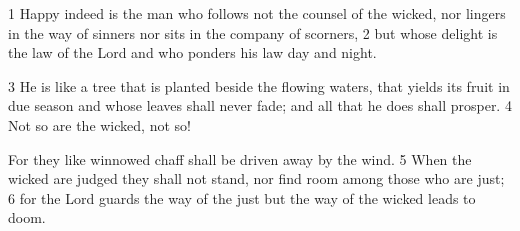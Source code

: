 1 Happy indeed is the man
who follows not the counsel of the wicked,
nor lingers in the way of sinners
nor sits in the company of scorners,
2 but whose delight is the law of the Lord
and who ponders his law day and night.

3 He is like a tree that is planted
beside the flowing waters,
that yields its fruit in due season
and whose leaves shall never fade;
and all that he does shall prosper.
4 Not so are the wicked, not so!

For they like winnowed chaff
shall be driven away by the wind.
5 When the wicked are judged they shall not stand,
nor find room among those who are just;
6 for the Lord guards the way of the just
but the way of the wicked leads to doom.
